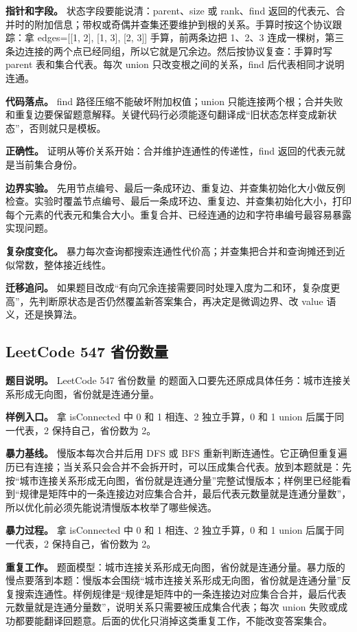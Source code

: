\textbf{指针和字段。} 状态字段要能说清：parent、size 或 rank、find 返回的代表元、合并时的附加信息；带权或奇偶并查集还要维护到根的关系。手算时按这个协议跟踪：拿 edges=[[1, 2], [1, 3], [2, 3]] 手算，前两条边把 1、2、3 连成一棵树，第三条边连接的两个点已经同组，所以它就是冗余边。然后按协议复查：手算时写 parent 表和集合代表。每次 union 只改变根之间的关系，find 后代表相同才说明连通。

\textbf{代码落点。} find 路径压缩不能破坏附加权值；union 只能连接两个根；合并失败和重复边要保留题意解释。关键代码行必须能逐句翻译成“旧状态怎样变成新状态”，否则就只是模板。

\textbf{正确性。} 证明从等价关系开始：合并维护连通性的传递性，find 返回的代表元就是当前集合身份。

\textbf{边界实验。} 先用节点编号、最后一条成环边、重复边、并查集初始化大小做反例检查。实验时覆盖节点编号、最后一条成环边、重复边、并查集初始化大小，打印每个元素的代表元和集合大小。重复合并、已经连通的边和字符串编号最容易暴露实现问题。

\textbf{复杂度变化。} 暴力每次查询都搜索连通性代价高；并查集把合并和查询摊还到近似常数，整体接近线性。

\textbf{迁移追问。} 如果题目改成“有向冗余连接需要同时处理入度为二和环，复杂度更高”，先判断原状态是否仍然覆盖新答案集合，再决定是微调边界、改 value 语义，还是换算法。

\subsection{LeetCode 547 省份数量}

\textbf{题目说明。} LeetCode 547 省份数量 的题面入口要先还原成具体任务：城市连接关系形成无向图，省份就是连通分量。

\textbf{样例入口。} 拿 isConnected 中 0 和 1 相连、2 独立手算，0 和 1 union 后属于同一代表，2 保持自己，省份数为 2。

\textbf{暴力基线。} 慢版本每次合并后用 DFS 或 BFS 重新判断连通性。它正确但重复遍历已有连接；当关系只会合并不会拆开时，可以压成集合代表。放到本题就是：先按“城市连接关系形成无向图，省份就是连通分量”完整试慢版本；样例里已经能看到“规律是矩阵中的一条连接边对应集合合并，最后代表元数量就是连通分量数”，所以优化前必须先能说清慢版本枚举了哪些候选。

\textbf{暴力过程。} 拿 isConnected 中 0 和 1 相连、2 独立手算，0 和 1 union 后属于同一代表，2 保持自己，省份数为 2。

\textbf{重复工作。} 题面模型：城市连接关系形成无向图，省份就是连通分量。暴力版的慢点要落到本题：慢版本会围绕“城市连接关系形成无向图，省份就是连通分量”反复搜索连通性。样例规律是“规律是矩阵中的一条连接边对应集合合并，最后代表元数量就是连通分量数”，说明关系只需要被压成集合代表；每次 union 失败或成功都要能翻译回题意。后面的优化只消掉这类重复工作，不能改变答案集合。

